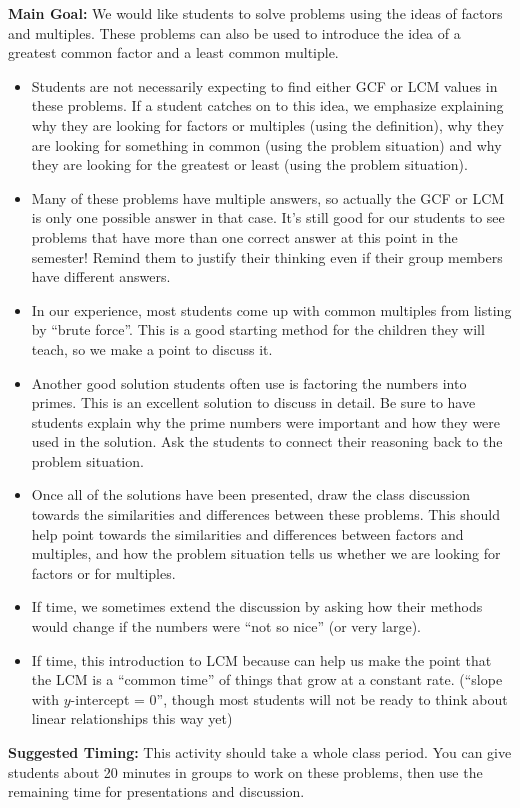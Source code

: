 \documentclass[nooutcomes, noauthor]{ximera}
\begin{document}
\newpage
\begin{instructorNotes}

{\bf Main Goal:} We would like students to solve problems using the ideas of factors and multiples. These problems can also be used to introduce the idea of a greatest common factor and a least common multiple.

\begin{itemize}
	\item Students are not necessarily expecting to find either GCF or LCM values in these problems. If a student catches on to this idea, we emphasize explaining why they are looking for factors or multiples (using the definition), why they are looking for something in common (using the problem situation) and why they are looking for the greatest or least (using the problem situation).
	\item Many of these problems have multiple answers, so actually the GCF or LCM is only one possible answer in that case. It's still good for our students to see problems that have more than one correct answer at this point in the semester! Remind them to justify their thinking even if their group members have different answers.
	\item In our experience, most students come up with common multiples from listing by ``brute force''. This is a good starting method for the children they will teach, so we make a point to discuss it.
	\item Another good solution students often use is factoring the numbers into primes. This is an excellent solution to discuss in detail. Be sure to have students explain why the prime numbers were important and how they were used in the solution. Ask the students to connect their reasoning back to the problem situation.
	\item Once all of the solutions have been presented, draw the class discussion towards the similarities and differences between these problems. This should help point towards the similarities and differences between factors and multiples, and how the problem situation tells us whether we are looking for factors or for multiples.
	\item If time, we sometimes extend the discussion by asking how their methods would change if the numbers were ``not so nice'' (or very large).
	\item If time, this introduction to LCM because can help us make the point that the LCM is a ``common time'' of things that grow at a constant rate. (``slope with $y$-intercept = 0'', though most students will not be ready to think about linear relationships this way yet)
\end{itemize}

{\bf Suggested Timing:} This activity should take a whole class period. You can give students about 20 minutes in groups to work on these problems, then use the remaining time for presentations and discussion.
\end{instructorNotes}
\end{document}
